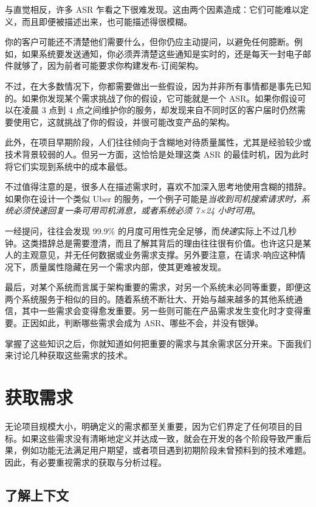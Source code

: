 \label{idx:162}
与直觉相反，许多 ASR 乍看之下很难发现。这由两个因素造成：它们可能难以定义，而且即便被描述出来，也可能描述得很模糊。

你的客户可能还不清楚他们需要什么，但你仍应主动提问，以避免任何臆断。例如，如果系统要发送通知，你必须弄清楚这些通知是实时的，还是每天一封电子邮件就够了，因为前者可能要求你构建发布-订阅架构。

不过，在大多数情况下，你都需要做出一些假设，因为并非所有事情都是事先已知的。如果你发现某个需求挑战了你的假设，它可能就是一个 ASR。如果你假设可以在凌晨 3 点到 4 点之间维护你的服务，却发现来自不同时区的客户届时仍然需要使用它，这就挑战了你的假设，并很可能改变产品的架构。

此外，在项目早期阶段，人们往往倾向于含糊地对待质量属性，尤其是经验较少或技术背景较弱的人。但另一方面，这恰恰是处理这类 ASR 的最佳时机，因为此时将它们实现到系统中的成本最低。

不过值得注意的是，很多人在描述需求时，喜欢不加深入思考地使用含糊的措辞。如果你在设计一个类似 Uber 的服务，一个例子可能是\emph{当收到司机搜索请求时，系统必须快速回复一条可用司机消息，或者系统必须 7×24 小时可用}。

\label{idx:163}
一经提问，往往会发现 99.9\% 的月度可用性完全足够，而\emph{快速}实际上不过几秒钟。这类措辞总是需要澄清，而且了解其背后的理由往往很有价值。也许这只是某人的主观意见，并无任何数据或业务需求支撑。另外要注意，在请求-响应这种情况下，质量属性隐藏在另一个需求内部，使其更难被发现。

最后，对某个系统而言属于架构重要的需求，对另一个系统未必同等重要，即便这两个系统服务于相似的目的。随着系统不断壮大、开始与越来越多的其他系统通信，其中一些需求会变得愈发重要。另一些则可能在产品需求发生变化时才变得重要。正因如此，判断哪些需求会成为 ASR、哪些不会，并没有银弹。

掌握了这些知识之后，你就知道如何把重要的需求与其余需求区分开来。下面我们来讨论几种获取这些需求的技术。

\section{获取需求}

\label{idx:164}
无论项目规模大小，明确定义的需求都至关重要，因为它们界定了任何项目的目标。如果这些需求没有清晰地定义并达成一致，就会在开发的各个阶段导致严重后果，例如功能无法满足用户期望，或者项目遇到初期阶段未曾预料到的技术难题。因此，有必要重视需求的获取与分析过程。

\subsection{了解上下文}

